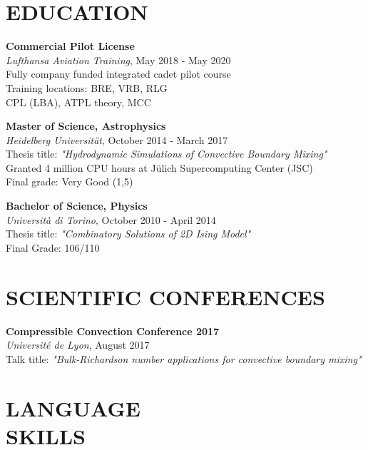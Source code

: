 \documentclass[margin]{res}
\begin{document}
\begin{resume}
\section{EDUCATION}

\textbf{Commercial Pilot License}\\
{\sl Lufthansa Aviation Training}, May 2018 - May 2020\\
Fully company funded integrated cadet pilot course\\
Training locations: BRE, VRB, RLG\\
CPL (LBA), ATPL theory, MCC

\textbf{Master of Science, Astrophysics}\\
{\sl Heidelberg Universität}, October 2014 - March 2017\\
Thesis title: \textit{"Hydrodynamic Simulations of Convective Boundary Mixing"}\\
Granted 4 million CPU hours at Jülich Supercomputing Center (JSC)\\
\hfill Final grade: Very Good (1,5)

\textbf{Bachelor of Science, Physics} \\
{\sl Università di Torino}, October 2010 - April 2014\\
Thesis title: \textit{"Combinatory Solutions of 2D Ising Model"}\\
\hfill Final Grade: 106/110
\section{SCIENTIFIC CONFERENCES}

\textbf{Compressible Convection Conference 2017}\\
{\sl Université de Lyon}, August 2017\\
Talk title: \textit{"Bulk-Richardson number applications for convective boundary mixing"}  

\bigskip

\pagebreak

\section{LANGUAGE\\SKILLS}


\end{resume}
\end{document}
